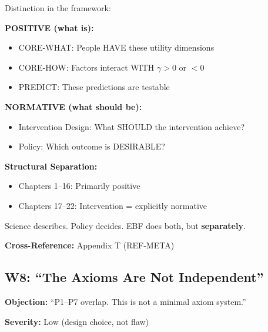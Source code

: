 \begin{axiom}
Distinction in the framework:

\textbf{POSITIVE (what is):}
\begin{itemize}[nosep]
    \item CORE-WHAT: People HAVE these utility dimensions
    \item CORE-HOW: Factors interact WITH $\gamma > 0$ or $< 0$
    \item PREDICT: These predictions are testable
\end{itemize}

\textbf{NORMATIVE (what should be):}
\begin{itemize}[nosep]
    \item Intervention Design: What SHOULD the intervention achieve?
    \item Policy: Which outcome is DESIRABLE?
\end{itemize}

\textbf{Structural Separation:}
\begin{itemize}[nosep]
    \item Chapters 1--16: Primarily positive
    \item Chapters 17--22: Intervention = explicitly normative
\end{itemize}

Science describes. Policy decides. EBF does both, but \textbf{separately}.
\end{axiom}

\textbf{Cross-Reference:} Appendix T (REF-META)

\subsection{W8: ``The Axioms Are Not Independent''}
\label{sec:da-w8}

\begin{tcolorbox}[colback=gray!5!white, colframe=gray!75!black]
\textbf{Objection:} ``P1--P7 overlap. This is not a minimal axiom system.''

\textbf{Severity:} Low (design choice, not flaw)
\end{tcolorbox}

